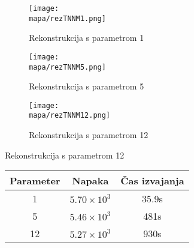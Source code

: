 \renewcommand{\mapa}{Poglavja/Slike/informacija ranga}
\begin{figure}[!ht]
    \begin{subfigure}{0.325\linewidth}
        \texttt{[image: \\mapa/rezTNNM1.png]}
        \caption{Rekonstrukcija s parametrom 1}
    \end{subfigure}
    \hfill
    \begin{subfigure}{0.325\linewidth}
        \texttt{[image: \\mapa/rezTNNM5.png]}
        \caption{Rekonstrukcija s parametrom 5}
    \end{subfigure}
    \hfill
    \begin{subfigure}{0.325\linewidth}
        \texttt{[image: \\mapa/rezTNNM12.png]}
        \caption{Rekonstrukcija s parametrom 12}
    \end{subfigure}
\end{figure}

\begin{figure}[h]
    \centering
    \begin{tabular}{|c|c|c|}
        \hline
        Parameter & Napaka & Čas izvajanja \\
        \hline
        1 & $5.70 \times 10^{3}$ & 35.9s \\
        5 & $5.46 \times 10^{3}$ & 481s \\
        12 & $5.27 \times 10^{3}$ & 930s \\
        \hline
    \end{tabular}
\end{figure}
